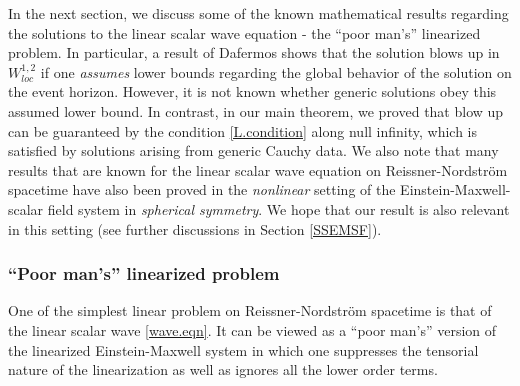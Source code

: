 \documentclass[12 pt, reqno]{amsart}
\theoremstyle{definition}
\theoremstyle{remark}
\numberwithin{equation}{section}
\newcommand{\0}{\emptyset}
\begin{document}
In the next section, we discuss some of the known mathematical results regarding the solutions to the linear scalar wave equation - the ``poor man's'' linearized problem. In particular, a result of Dafermos shows that the solution blows up in $W^{1,2}_{loc}$ if one \emph{assumes} lower bounds regarding the global behavior of the solution on the event horizon. However, it is not known whether generic solutions obey this assumed lower bound. In contrast, in our main theorem, we proved that blow up can be guaranteed by the condition \eqref{L.condition} along null infinity, which is satisfied by solutions arising from generic Cauchy data.  We also note that many results that are known for the linear scalar wave equation on Reissner-Nordstr\"om spacetime have also been proved in the \emph{nonlinear} setting of the Einstein-Maxwell-scalar field system in \emph{spherical symmetry}. We hope that our result is also relevant in this setting (see further discussions in Section \ref{SSEMSF}).

\subsubsection{``Poor man's'' linearized problem}

One of the simplest linear problem on Reissner-Nordstr\"om spacetime is that of the linear scalar wave \eqref{wave.eqn}. It can be viewed as a ``poor man's'' version of the linearized Einstein-Maxwell system in which one suppresses the tensorial nature of the linearization as well as ignores all the lower order terms.
\end{document}
